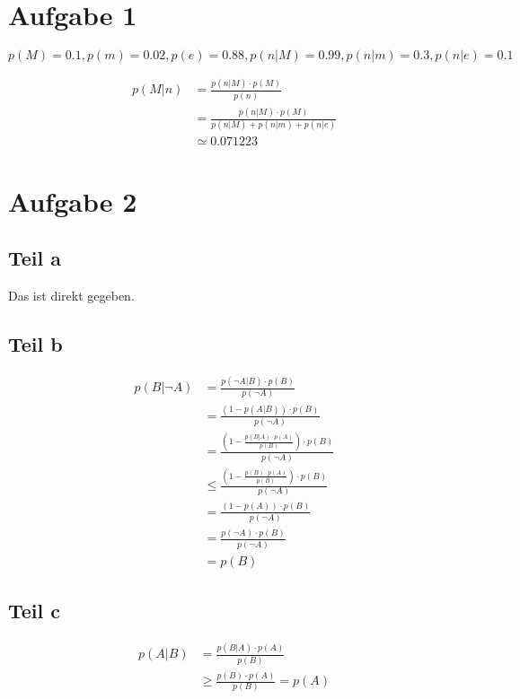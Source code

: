 \documentclass[10pt,a4paper]{article}
\begin{document}
\section{Aufgabe 1}

\begin{equation}
  p(M) = 0.1, p(m) = 0.02, p(e) = 0.88, p(n | M) = 0.99, p(n | m) = 0.3, p(n | e) = 0.1
\end{equation}

\begin{align*}
  p(M | n) & = \frac{p(n | M) \cdot p(M)}{p(n)}\\
  & = \frac{p(n | M) \cdot p(M)}{p(n | M) + p(n | m) + p(n | e)}\\
  & \simeq 0.071223
\end{align*}

\section{Aufgabe 2}

\subsection{Teil a}

Das ist direkt gegeben.

\subsection{Teil b}

\begin{align*}
  p(B | \lnot A) & = \frac{p(\lnot A | B) \cdot p(B)}{p(\lnot A)}\\
  & = \frac{(1 - p(A | B)) \cdot p(B)}{p(\lnot A)}\\
  & = \frac{(1 - \frac{p(B | A) \cdot p(A)}{p(B)}) \cdot p(B)}{p(\lnot A)}\\
  & \le \frac{(1 - \frac{p(B) \cdot p(A)}{p(B)}) \cdot p(B)}{p(\lnot A)}\\
  & = \frac{(1 - p(A)) \cdot p(B)}{p(\lnot A)}\\
  & = \frac{p(\lnot A) \cdot p(B)}{p(\lnot A)}\\
  & = p(B)
\end{align*}

\subsection{Teil c}

\begin{align*}
  p(A | B) & = \frac{p(B | A) \cdot p(A)}{p(B)}\\
  & \ge \frac{p(B) \cdot p(A)}{p(B)} = p(A)
\end{align*}
\end{document}
